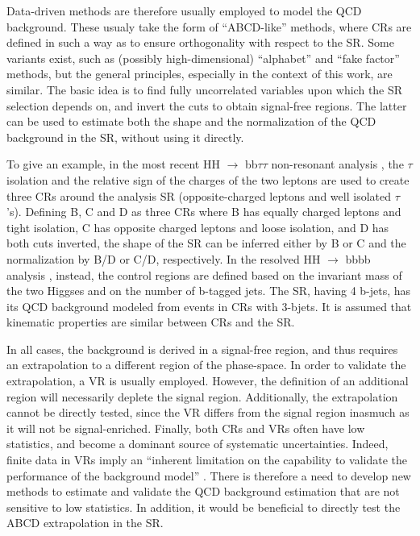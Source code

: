 \documentclass[11pt]{article}
\newcommand{\bbbb}{HH $\rightarrow$ bbbb}
\newcommand{\bbtt}{HH $\rightarrow$ bb$\tau\tau$}
\begin{document}
\begin{enumerate}
Data-driven methods are therefore usually employed to model the \ac{QCD} background.
These usualy take the form of ``ABCD-like'' methods, where \acp{CR} are defined in such a way as to ensure orthogonality with respect to the \ac{SR}.
Some variants exist, such as (possibly high-dimensional) ``alphabet'' \cite{corcodilos_thesis} and ``fake factor'' \cite{fake_factor_method,higgs_bbtautau_hy} methods, but the general principles, especially in the context of this work, are similar.
The basic idea is to find fully uncorrelated variables upon which the \ac{SR} selection depends on, and invert the cuts to obtain signal-free regions.
The latter can be used to estimate both the shape and the normalization of the \ac{QCD} background in the \ac{SR}, without using it directly.

To give an example, in the most recent \bbtt{} non-resonant analysis \cite{higgs_bbtautau_nonres}, the \(\tau\) isolation and the relative sign of the charges of the two leptons are used to create three \acp{CR} around the analysis \ac{SR} (opposite-charged leptons and well isolated \(\tau\)'s). Defining B, C and D as three \acp{CR} where B has equally charged leptons and tight isolation, C has opposite charged leptons and loose isolation, and D has both cuts inverted, the shape of the \ac{SR} can be inferred either by B or C and the normalization by B/D or C/D, respectively.
In the resolved \bbbb{} analysis \cite{bbbb_resolved_cms}, instead, the control regions are defined based on the invariant mass of the two Higgses and on the number of b-tagged jets.
The \ac{SR}, having 4 b-jets, has its \ac{QCD} background modeled from events in \acp{CR} with 3-bjets.
It is assumed that kinematic properties are similar between \acp{CR} and the \ac{SR}. 

In all cases, the background is derived in a signal-free region, and thus requires an extrapolation to a different region of the phase-space.
In order to validate the extrapolation, a \ac{VR} is usually employed.
However, the definition of an additional region will necessarily deplete the signal region.
Additionally, the extrapolation cannot be directly tested, since the \ac{VR} differs from the signal region inasmuch as it will not be signal-enriched.
Finally, both \acp{CR} and \acp{VR} often have low statistics, and become a dominant source of systematic uncertainties.
Indeed, finite data in \acp{VR} imply an ``inherent limitation on the capability to validate the performance of the background model'' \cite{zz_zh_bbbb}.
There is therefore a need to develop new methods to estimate and validate the \ac{QCD} background estimation that are not sensitive to low statistics.
In addition, it would be beneficial to directly test the ABCD extrapolation in the \ac{SR}.



\end{enumerate}
\end{document}
